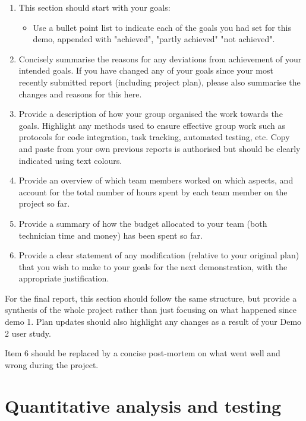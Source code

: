 \documentclass{article}
\begin{document}
\begin{enumerate}
    \item This section should start with your goals:
\begin{itemize}
    \item Use a bullet point list to indicate each of the goals you had set for this demo, appended with "achieved", "partly achieved" "not achieved".
\end{itemize}


\item Concisely summarise the reasons for any deviations from achievement of your intended goals. 
If you have changed any of your goals since your most recently submitted report (including project plan), please also summarise the changes and reasons for this here.
\item Provide a description of how your group organised the work towards the goals. Highlight any methods used to ensure effective group work such as protocols for code integration, task tracking, automated testing, etc. 
Copy and paste from your own previous reports is authorised but should be clearly indicated using text colours.

\item Provide an overview of which team members worked on which aspects, and account for the total number of hours spent by each team member on the project so far.

\item Provide a summary of how the budget allocated to your team (both technician time and money) has been spent so far.

\item Provide a clear statement of any modification (relative to your original plan) that you wish to make to your goals for the next demonstration, with the appropriate justification.

\end{enumerate}

For the final report, this section should follow the same structure, but provide a synthesis of the whole project rather than just focusing on what happened since demo 1. Plan updates should also highlight any changes as a result of your Demo 2 user study. 

Item 6 should be replaced by a concise post-mortem on what went well and wrong during the project.


\section{Quantitative analysis and testing}
\end{document}
